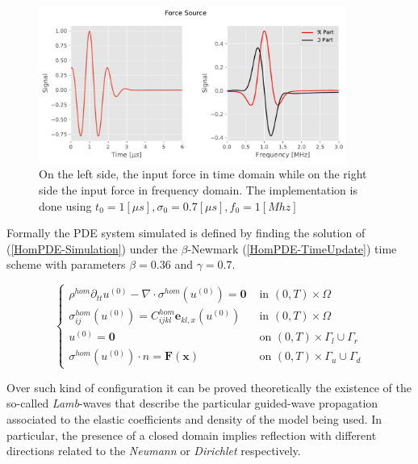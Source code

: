 \begin{figure}[!h]
	\centering
	\includegraphics[width=0.9\textwidth]{images/ImgExt/ForceSource.pdf}
	\caption{On the left side, the input force in time domain while on the right side the input force in frequency domain. The implementation is done using $t_0 = 1 [\mu s], \sigma_0 = 0.7 [\mu s], f_0 = 1 [Mhz]$}
	\label{ForceSource}
\end{figure}


Formally the PDE system simulated is defined
by finding the solution of (\ref{HomPDE-Simulation}) under the $\beta$-Newmark (\ref{HomPDE-TimeUpdate}) time scheme with parameters $\beta = 0.36$ and $\gamma = 0.7$.

\begin{equation}
    \label{HomPDE-Simulation}
    \left \{
    \begin{array}{cc}
        \rho^{hom} \partial_{tt} u^{(0)} - \nabla \cdot \sigma^{hom} (u^{(0)}) = \mathbf{0} & \text{ in } (0,T)\times \Omega \\
        \sigma^{hom}_{ij}(u^{(0)}) = C^{hom}_{ijkl}\mathbf{e}_{kl,x}(u^{(0)}) & \text{ in } (0,T)\times \Omega \\
        u^{(0)} = \mathbf{0} & \text{ on } (0,T)\times \Gamma_l \cup \Gamma_r \\
        \sigma^{hom}(u^{(0)}) \cdot n = \mathbf{F}(\mathbf{x}) & \text{ on } (0,T)\times \Gamma_u \cup \Gamma_d
    \end{array}
    \right .
\end{equation}

Over such kind of configuration it can be proved theoretically the existence of the so-called \textit{Lamb}-waves that describe the particular guided-wave propagation associated to the elastic coefficients and density of the model being used.
In particular, the presence of a closed domain implies reflection with different directions related to the \textit{Neumann} or \textit{Dirichlet} respectively.


